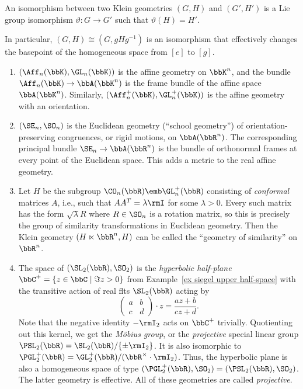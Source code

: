 \begin{defn}
    An isomorphism between two Klein geometries $(G,H)$ and $(G',H')$ is a Lie group isomorphism $\vartheta:G\to G'$ such that $\vartheta(H)=H'$.
\end{defn}

In particular, $(G,H)\cong (G,gHg^{-1})$ is an isomorphism that effectively changes the basepoint of the homogeneous space from $[e]$ to $[g]$.

\begin{example}\label{ex basic klein geometries}
    \begin{enumerate}
        \item $(\Aff_n(\bbK), \GL_n(\bbK))$ is the affine geometry on $\bbK^n$, and the bundle $\Aff_n(\bbK)\to \bbA(\bbK^n)$ is the frame bundle of the affine space $\bbA(\bbK^n)$. Similarly, $(\Aff_n^+(\bbK), \GL_n^+(\bbK))$ is the affine geometry with an orientation.

        \item $(\SE_n,\SO_n)$ is the Euclidean geometry (``school geometry'') of orientation-preserving congruences, or rigid motions, on $\bbA(\bbR^n)$. The corresponding principal bundle $\SE_n\to \bbA(\bbR^n)$ is the bundle of orthonormal frames at every point of the Euclidean space. This adds a metric to the real affine geometry.

        \item Let $H$ be the subgroup $\CO_n(\bbR)\emb\GL_n^+(\bbR)$ consisting of \emph{conformal} matrices $A$, i.e., such that $AA^T=\lambda \rmI$ for some $\lambda>0$. Every such matrix has the form $\sqrt{\lambda}R$ where $R\in\SO_n$ is a rotation matrix, so this is precisely the group of similarity transformations in Euclidean geometry. Then the Klein geometry $(H\ltimes \bbR^n,H)$ can be called the ``geometry of similarity'' on $\bbR^n$.
        
        \item The space of $(\SL_2(\bbR),\SO_2)$ is the \emph{hyperbolic half-plane} $\bbC^+=\{z\in \bbC\mid \Im z>0\}$ from Example~\ref{ex siegel upper half-space} with the transitive action of real \glspl{flt} $\SL_2(\bbR)$ acting by 
        \[\begin{pmatrix}
            a&b\\c&d
        \end{pmatrix}\cdot z=\frac{az+b}{cz+d}.\]
        Note that the negative identity $-\rmI_2$ acts on $\bbC^+$ trivially. Quotienting out this kernel, we get the \emph{M\"obius group}, or the \emph{projective} special linear group $\PSL_2(\bbR)=\SL_2(\bbR)\slash \{\pm \rmI_2\}$. It is also isomorphic to $\PGL^+_2(\bbR)=\GL^+_2(\bbR)\slash (\bbR^\times\cdot \rmI_2)$. Thus, the hyperbolic plane is also a homogeneous space of type $(\PGL^+_2(\bbR),\SO_2)=(\PSL_2(\bbR),\SO_2)$. The latter geometry is effective. All of these geometries are called \emph{projective}.


\end{enumerate}
\end{example}
